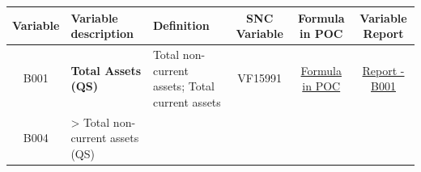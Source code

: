 \documentclass[]{book}
\begin{document}
\begin{longtable}[]{@{}cllccc@{}}
\toprule
\begin{minipage}[b]{0.08\columnwidth}\centering
Variable\strut
\end{minipage} & \begin{minipage}[b]{0.20\columnwidth}\raggedright
Variable description\strut
\end{minipage} & \begin{minipage}[b]{0.16\columnwidth}\raggedright
Definition\strut
\end{minipage} & \begin{minipage}[b]{0.09\columnwidth}\centering
SNC Variable\strut
\end{minipage} & \begin{minipage}[b]{0.15\columnwidth}\centering
Formula in POC\strut
\end{minipage} & \begin{minipage}[b]{0.16\columnwidth}\centering
Variable Report\strut
\end{minipage}\tabularnewline
\midrule
\endhead
\begin{minipage}[t]{0.08\columnwidth}\centering
B001\strut
\end{minipage} & \begin{minipage}[t]{0.20\columnwidth}\raggedright
\textbf{Total Assets (QS)}\strut
\end{minipage} & \begin{minipage}[t]{0.16\columnwidth}\raggedright
Total non-current assets; Total current assets\strut
\end{minipage} & \begin{minipage}[t]{0.09\columnwidth}\centering
VF15991\strut
\end{minipage} & \begin{minipage}[t]{0.15\columnwidth}\centering
\protect\hyperlink{b001---formula-in-poc}{Formula in POC}\strut
\end{minipage} & \begin{minipage}[t]{0.16\columnwidth}\centering
\href{./Auxiliary\%20Files/technical_reports/variable_report/B001(!).pdf}{Report - B001}\strut
\end{minipage}\tabularnewline
\begin{minipage}[t]{0.08\columnwidth}\centering
B004\strut
\end{minipage} & \begin{minipage}[t]{0.20\columnwidth}\raggedright
\textgreater{} Total non-current assets (QS)\strut
\end{minipage} & \begin{minipage}[t]{0.16\columnwidth}\raggedright

\end{minipage}
\end{longtable}
\end{document}
